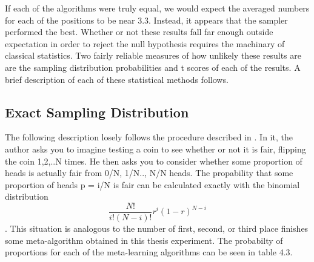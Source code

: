 If each of the algorithms were truly equal, we would expect the averaged numbers for each
of the positions to be near 3.3. Instead, it appears that the sampler performed the best. Whether or not
these results fall far enough outside expectation in order to reject the null hypothesis requires
the machinary of classical statistics. Two fairly reliable measures of how unlikely these results are
are the sampling distribution probabilities and t scores of each of the results. A brief description of each of these
statistical methods follows.

\subsection{Exact Sampling Distribution}
The following description losely follows the procedure described in \cite{Cohen}.
In it, the author asks you to imagine testing a coin to see whether or not it
is fair, flipping the coin 1,2,..N times. He then asks you to consider whether
some proportion of heads is actually fair from 0/N, 1/N.., N/N heads. The
propability that some proportion of heads p = i/N is fair can be calculated
exactly with the binomial distribution $$\frac{N!}{i!(N-i)!}r^{i}(1-r)^{N-i}$$.
This situation is analogous to the number of first, second, or third place
finishes some meta-algorithm obtained in this thesis experiment. The probabilty
of proportions for each of the meta-learning algorithms can be seen in table 4.3.

